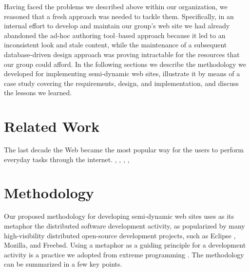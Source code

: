 \documentclass[10pt]{article}
\begin{document}
Having faced the problems we described above within our organization,
we reasoned that a fresh approach was needed to tackle them.
Specifically,
in an internal effort to develop and maintain our group's web site
we had already abandoned the ad-hoc authoring tool--based approach
because it led to an inconsistent look and stale content,
while the maintenance of a subsequent database-driven
design approach was proving intractable for the resources that
our group could afford.
In the following sections we describe the methodology we developed
for implementing semi-dynamic web sites,
illustrate it by means
of a case study covering the requirements, design, and implementation,
and discuss the lessons we learned.

\section{Related Work}
\label{sec:related}

The last decade the Web became the most popular way for the users to perform everyday
tasks through the internet. 
\cite{FRA99}, \cite{MAM03}, \cite{FST99}, \cite{FP00}, \cite{KL03}

\section{Methodology}
\label{sec:meth}
Our proposed methodology for developing semi-dynamic web sites uses as
its metaphor the distributed software development activity, as popularized
by many high-visibility distributed open-source development projects,
such as Eclipse \cite{GB04}, Mozilla, and Free{\sc bsd}.
Using a metaphor as a guiding principle for a development activity
is a practice we adopted from extreme programming \cite{Bec00}.
The methodology can be summarized in a few key points.
\end{document}
